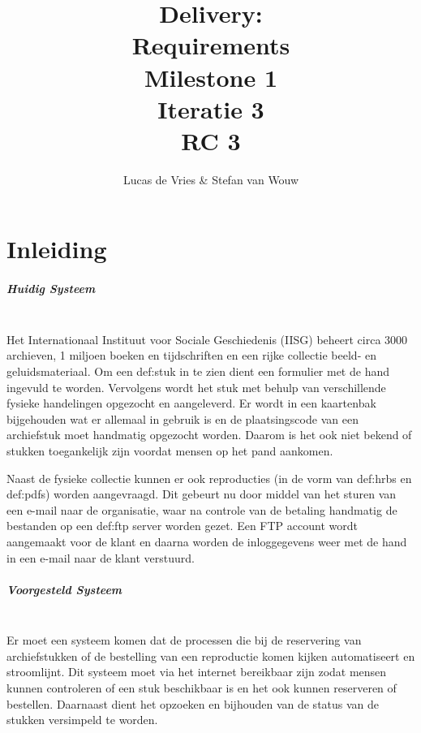 \documentclass[a4paper,titlepage]{report}
\title{Delivery:\\ Requirements\\ Milestone 1\\ Iteratie 3\\ RC 3}
\author{Lucas de Vries \& Stefan van Wouw}
\begin{document}
\maketitle


\setcounter{secnumdepth}{5}
\setcounter{tocdepth}{2}

\tableofcontents
\pagebreak


\chapter{Inleiding}
\paragraph*{Huidig Systeem}\hfill\\
Het Internationaal Instituut voor Sociale Geschiedenis (IISG) beheert circa 3000
archieven, 1 miljoen boeken en tijdschriften en een rijke collectie beeld- en
geluidsmateriaal. Om een \gls{def:stuk} 
in te zien dient een formulier met de hand
ingevuld te worden. Vervolgens wordt het stuk met behulp van verschillende
fysieke handelingen opgezocht en aangeleverd. Er wordt in een kaartenbak
bijgehouden wat er allemaal in gebruik is en de plaatsingscode van een
archiefstuk moet handmatig opgezocht worden. Daarom is het ook niet bekend of
stukken toegankelijk zijn voordat mensen op het pand aankomen.

Naast de fysieke collectie kunnen er ook reproducties (in de vorm van
\glspl{def:hrb} en \glspl{def:pdf}) worden aangevraagd. Dit gebeurt nu door middel van het
sturen van een e-mail naar de organisatie, waar na controle van de betaling
handmatig de bestanden op een \gls{def:ftp} server worden gezet. Een FTP account wordt
aangemaakt voor de klant en daarna worden de inloggegevens weer met de hand in
een e-mail naar de klant verstuurd.

\paragraph*{Voorgesteld Systeem}\hfill\\
Er moet een systeem komen dat de processen die bij de reservering van
archiefstukken of de bestelling van een reproductie komen kijken automatiseert
en stroomlijnt. Dit systeem moet via het internet bereikbaar zijn zodat mensen
kunnen controleren of een stuk beschikbaar is en het ook kunnen reserveren of
bestellen. Daarnaast dient het opzoeken en bijhouden van de status van de
stukken versimpeld te worden.
\end{document}
